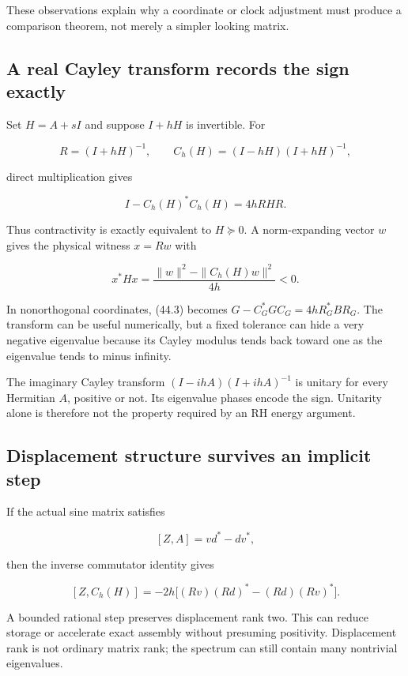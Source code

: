 \documentclass[
  10pt,
  a4paper,
  10pt,
  oneside,
  openany]{book}
\begin{document}
These observations explain why a coordinate or clock adjustment must
produce a comparison theorem, not merely a simpler looking matrix.

\subsection{A real Cayley transform records the sign
exactly}\label{a-real-cayley-transform-records-the-sign-exactly}

Set \(H=A+sI\) and suppose \(I+hH\) is invertible. For

\[
 R=(I+hH)^{-1},\qquad C_h(H)=(I-hH)(I+hH)^{-1},
\]

direct multiplication gives

\[
 I-C_h(H)^{*}C_h(H)=4hRHR.
 \tag{44.3}\label{eq:44.3}
\]

Thus contractivity is exactly equivalent to \(H\succeq0\). A
norm-expanding vector \(w\) gives the physical witness \(x=Rw\) with

\[
 x^{*}Hx=\frac{\|w\|^2-\|C_h(H)w\|^2}{4h}<0.
\]

In nonorthogonal coordinates, (44.3) becomes
\(G-C_G^{*}GC_G=4hR_G^{*}BR_G\). The transform can be useful
numerically, but a fixed tolerance can hide a very negative eigenvalue
because its Cayley modulus tends back toward one as the eigenvalue tends
to minus infinity.

The imaginary Cayley transform \((I-ihA)(I+ihA)^{-1}\) is unitary for
every Hermitian \(A\), positive or not. Its eigenvalue phases encode the
sign. Unitarity alone is therefore not the property required by an RH
energy argument.

\subsection{Displacement structure survives an implicit
step}\label{displacement-structure-survives-an-implicit-step}

If the actual sine matrix satisfies

\[
 [Z,A]=vd^{*}-dv^{*},
\]

then the inverse commutator identity gives

\[
 [Z,C_h(H)]=-2h\bigl[(Rv)(Rd)^{*}-(Rd)(Rv)^{*}\bigr].
 \tag{44.4}\label{eq:44.4}
\]

A bounded rational step preserves displacement rank two. This can reduce
storage or accelerate exact assembly without presuming positivity.
Displacement rank is not ordinary matrix rank; the spectrum can still
contain many nontrivial eigenvalues.
\end{document}
